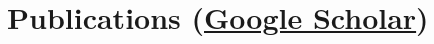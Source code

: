 

\section{Publications (\href{https://scholar.google.com/citations?user=RCi98EAAAAAJ&hl=en}{Google Scholar})}
\let\tempsection=\section
\renewcommand{\section}[2]{\subsection#1{#2}}






\let\section=\tempsection
